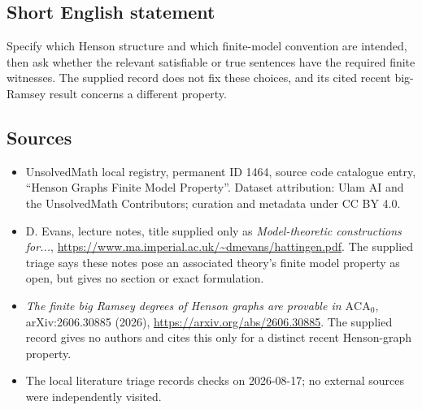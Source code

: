 \documentclass[11pt]{article}
\begin{document}
\subsection{Short English statement}
Specify which Henson structure and which finite-model convention are intended, then ask whether the relevant satisfiable or true sentences have the required finite witnesses. The supplied record does not fix these choices, and its cited recent big-Ramsey result concerns a different property.
\subsection{Sources}
\begin{itemize}
\item UnsolvedMath local registry, permanent ID 1464, source code catalogue entry, ``Henson Graphs Finite Model Property''. Dataset attribution: Ulam AI and the UnsolvedMath Contributors; curation and metadata under CC BY 4.0.
\item D. Evans, lecture notes, title supplied only as \emph{Model-theoretic constructions for...}, \url{https://www.ma.imperial.ac.uk/~dmevans/hattingen.pdf}. The supplied triage says these notes pose an associated theory's finite model property as open, but gives no section or exact formulation.
\item \emph{The finite big Ramsey degrees of Henson graphs are provable in $\mathrm{ACA}_0$}, arXiv:2606.30885 (2026), \url{https://arxiv.org/abs/2606.30885}. The supplied record gives no authors and cites this only for a distinct recent Henson-graph property.
\item The local literature triage records checks on 2026-08-17; no external sources were independently visited.
\end{itemize}
\end{document}
